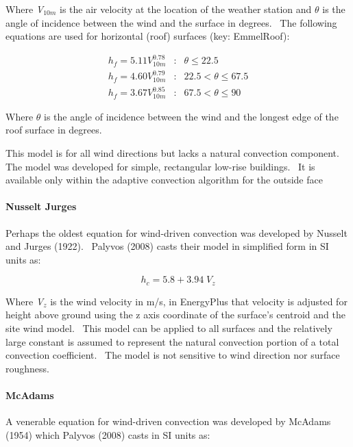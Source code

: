 Where \emph{V\(_{10m}\)} is the air velocity at the location of the weather station and \(\theta\) is the angle of incidence between the wind and the surface in degrees.~ The following equations are used for horizontal (roof) surfaces (key: EmmelRoof):

\begin{equation}
\begin{array}{lcl}
    h_f = 5.11V^{0.78}_{10m} & : & \theta \leq 22.5 \\
    h_f = 4.60V^{0.79}_{10m} & : & 22.5 < \theta \leq 67.5 \\
    h_f = 3.67V^{0.85}_{10m} & : & 67.5 < \theta \leq 90
\end{array}
\end{equation}

Where $\theta$ is the angle of incidence between the wind and the longest edge of the roof surface in degrees.

This model is for all wind directions but lacks a natural convection component.~ The model was developed for simple, rectangular low-rise buildings.~ It is available only within the adaptive convection algorithm for the outside face

\paragraph{Nusselt Jurges}\label{nusselt-jurges}

Perhaps the oldest equation for wind-driven convection was developed by Nusselt and Jurges (1922).~ Palyvos (2008) casts their model in simplified form in SI units as:

\begin{equation}
{h_c} = 5.8 + 3.94\;{V_z}
\end{equation}

Where \emph{V\(_{z}\)} is the wind velocity in m/s, in EnergyPlus that velocity is adjusted for height above ground using the z axis coordinate of the surface's centroid and the site wind model.~ This model can be applied to all surfaces and the relatively large constant is assumed to represent the natural convection portion of a total convection coefficient.~ The model is not sensitive to wind direction nor surface roughness.

\paragraph{McAdams}\label{mcadams}

A venerable equation for wind-driven convection was developed by McAdams (1954) which Palyvos (2008) casts in SI units as:

